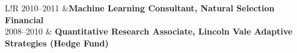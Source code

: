 \documentclass[10pt]{article}
\newcommand\VRule{\color{lightgray}\vrule width 0.5pt}
\begin{document}
\begin{longtable}{L!{\VRule}R}
2010--2011 &\textbf{Machine Learning Consultant, Natural Selection Financial}\\
2008--2010 & \textbf{Quantitative Research Associate, Lincoln Vale Adaptive Strategies (Hedge Fund)}\\
\end{longtable}
\end{document}

